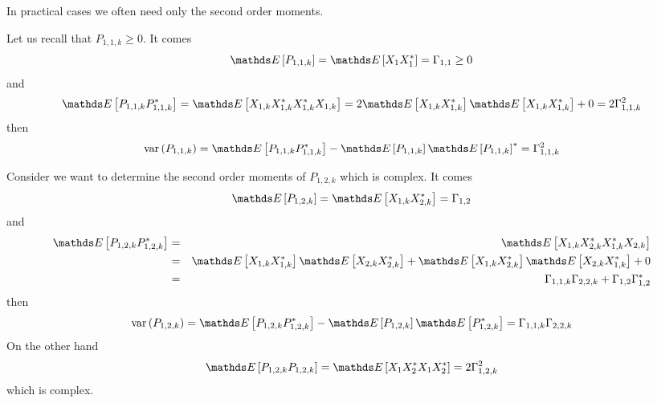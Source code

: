 In practical cases we often need only the second order moments. %
\begin{example}[Variance of $P_{1,1,k}$]
Let us recall that $P_{1,1,k}\ge 0$. It comes
$$
\esp{P_{1,1,k}}=\esp{X_{1}X_{1}^{*}}=\Gamma_{1,1}\geq 0
$$
and
$$
\esp{P_{1,1,k}P_{1,1,k}^{*}}=\esp{X_{1,k}X_{1,k}^{*}X_{1,k}^{*}X_{1,k}}
=2\esp{X_{1,k}X_{1,k}^{*}}\esp{X_{1,k}X_{1,k}^{*}}+0=2\Gamma_{1,1,k}^{2}
$$
then
$$
\var{P_{1,1,k}}=\esp{P_{1,1,k}P_{1,1,k}^{*}}-\esp{P_{1,1,k}}\esp{P_{1,1,k}}^{*}
=\Gamma_{1,1,k}^{2}
$$

\end{example}
\begin{example}[Variance of $P_{1,2,k}$]
Consider we want to determine the second order moments of $P_{1,2,k}$ which is complex. It comes
$$
\esp{P_{1,2,k}}=\esp{X_{1,k}X_{2,k}^{*}}=\Gamma_{1,2}
$$
and
\begin{eqnarray*}
\esp{P_{1,2,k}P_{1,2,k}^{*}}&=&\esp{X_{1,k}X_{2,k}^{*}X_{1,k}^{*}X_{2,k}}
\\
 &=&
\esp{X_{1,k}X_{1,k}^{*}}\esp{X_{2,k}X_{2,k}^{*}}+
 \esp{X_{1,k}X_{2,k}^{*}}\esp{X_{2,k}X_{1,k}^{*}}+0
 \\
 &=&
 \Gamma_{1,1,k}\Gamma_{2,2,k}+\Gamma_{1,2}\Gamma_{1,2}^{*}
\end{eqnarray*}
then
$$
\var{P_{1,2,k}}=\esp{P_{1,2,k}P_{1,2,k}^{*}}-\esp{P_{1,2,k}}\esp{P_{1,2,k}^{*}}
=\Gamma_{1,1,k}\Gamma_{2,2,k}
$$
On the other hand
$$
\esp{P_{1,2,k}P_{1,2,k}} = \esp{X_{1}X_{2}^{*}X_{1}X_{2}^{*}}
=
2 \Gamma_{1,2,k}^{2}
$$
which is complex.
\end{example}


